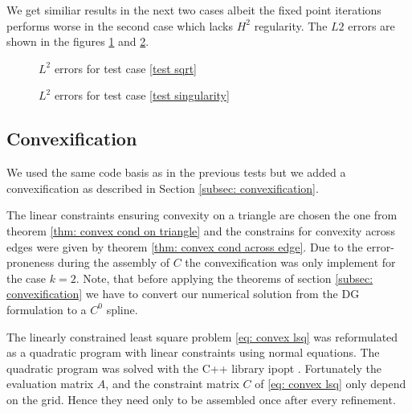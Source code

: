 We get similiar results in the next two cases albeit the fixed point iterations performs worse in the second case which lacks $H^2$ regularity. The $L2$ errors are shown in the figures \ref{fig: l2 errors test sqrt ourMethod} and \ref{fig: l2 errors test singularity ourMethod}.
 
\begin{figure}[H]
\centering
	\caption{$L^2$ errors for test case \ref{test sqrt}}
	\label{fig: l2 errors test sqrt ourMethod}
\end{figure}


\begin{figure}[H]
\centering
	\caption{$L^2$ errors for test case \ref{test singularity}}
	\label{fig: l2 errors test singularity ourMethod}
\end{figure}

\subsection{Convexification}

We used the same code basis as in the previous tests but we added a convexification as described in Section \ref{subsec: convexification}. 

The linear constraints ensuring convexity on a triangle are chosen the one from theorem \ref{thm: convex cond on triangle} and the constrains for convexity across edges were given by theorem \ref{thm: convex cond across edge}. Due to the error-proneness during the assembly of $C$ the convexification was only implement for the case $k=2$. Note, that before applying the theorems of section \ref{subsec: convexification} we have to convert our numerical solution from the DG formulation to a $C^0$ spline.

The linearly constrained least square problem \eqref{eq: convex lsq}  was reformulated as a quadratic program with linear constraints using normal equations. 
The quadratic program was solved with the C++ library ipopt \cite{ipopt}. Fortunately the evaluation matrix $A$, and the constraint matrix $C$ of \eqref{eq: convex lsq} only depend on the grid. Hence they need only to be assembled once after every refinement.


